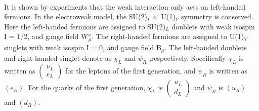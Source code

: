 \noindent\textbf{} \\
It is shown by experiments that the weak interaction only acts on left-handed fermions. In the electroweak model, the SU(2)$_L \times$ U(1)$_Y$ symmetry is conserved. Here the left-handed fermions are assigned to SU(2)$_L$ doublets with weak isospin I = 1/2, and gauge field W$^a_\mu$. The right-handed fermions are assigned to  U(1)$_Y$ singlets with weak isospin I = 0, and gauge field B$_\mu$.
The left-handed doublets and right-handed singlet denote as $\chi_{L}$ and $\psi_{R}$ ,respectively. Specifically $\chi_{L}$ is written as 
$
\left(\begin{array}{c}
\nu_{L} \\
e_{L}
\end{array}\right)
$
for the leptons of the first generation, and $\psi_{R}$ is written as $(e_R)$.
For the quarks of the first generation, $\chi_{L}$ is 
$
\left(\begin{array}{c}
u_{L} \\
d_{L}
\end{array}\right)
$
and $\psi_{R}$ is $(u_R)$ and $(d_R)$.


